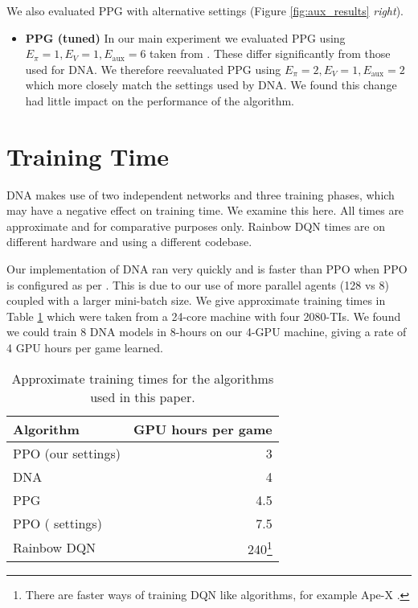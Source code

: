 \documentclass{article}
\begin{document}
We also evaluated PPG with alternative settings (Figure \ref{fig:aux_results} \textit{right}).

\begin{itemize}
\item \textbf{PPG (tuned)} In our main experiment we evaluated PPG using $E_\pi=1, E_V=1, E_\text{aux}=6$ taken from \cite{cobbe2021phasic}. These differ significantly from those used for DNA. We therefore reevaluated PPG using $E_\pi=2, E_V=1, E_\text{aux}=2$ which more closely match the settings used by DNA. We found this change had little impact on the performance of the algorithm.
\end{itemize}



\section{Training Time}
\label{app:time}

DNA makes use of two independent networks and three training phases, which may have a negative effect on training time. We examine this here. All times are approximate and for comparative purposes only. Rainbow DQN times are on different hardware and using a different codebase.

Our implementation of DNA ran very quickly and is faster than PPO when PPO is configured as per \cite{schulman2017proximal}. This is due to our use of more parallel agents (128 vs 8) coupled with a larger mini-batch size. We give approximate training times in Table \ref{tab:training_times} which were taken from a 24-core machine with four 2080-TIs. We found we could train 8 DNA models in 8-hours on our 4-GPU machine, giving a rate of 4 GPU hours per game learned. 

\begin{table}[h]
    \caption{Approximate training times for the algorithms used in this paper.}
    \label{tab:training_times}
    \centering
    \begin{tabular}{l r}
        \toprule
        Algorithm & GPU hours per game \\ 
        \midrule
        PPO (our settings)      & 3  \\
        DNA                     & 4  \\
        PPG                     & 4.5  \\
        PPO (\cite{schulman2017proximal} settings)      & 7.5 \\        
        Rainbow DQN & 240\footnote{There are faster ways of training DQN like algorithms, for example Ape-X \cite{horgan2018distributed}.}\\
        \bottomrule
    \end{tabular}
    
\end{table}
\end{document}

